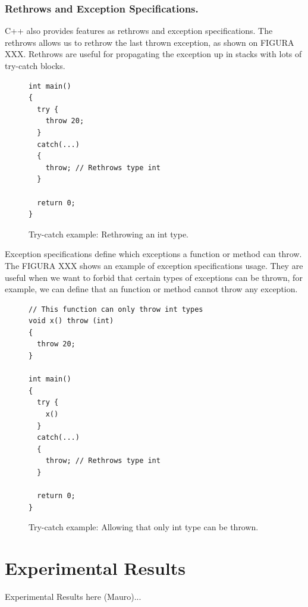 \documentclass[a4paper]{llncs}
\begin{document}
\subsubsection{Rethrows and Exception Specifications.}

C++ also provides features as rethrows and exception specifications. The rethrows allows us to rethrow the last thrown exception, 
as shown on FIGURA XXX. Rethrows are useful for propagating the exception up in stacks with lots of try-catch blocks.

\begin{figure}[ht]
\centering
\begin{minipage}{0.7\textwidth}
\begin{lstlisting}
int main() 
{
  try {
    throw 20;
  }
  catch(...)
  { 
    throw; // Rethrows type int
  }

  return 0;
}
\end{lstlisting}
\end{minipage}
\caption{Try-catch example: Rethrowing an int type.}
\label{figure:try-catch-example}
\end{figure}

Exception specifications define which exceptions a function or method can throw. The FIGURA XXX shows an example of exception specifications
usage. They are useful when we want to forbid that certain types of exceptions can be thrown, for example, we can define that an function
or method cannot throw any exception.

\begin{figure}[ht]
\centering
\begin{minipage}{0.7\textwidth}
\begin{lstlisting}
// This function can only throw int types
void x() throw (int) 
{ 
  throw 20;
}

int main() 
{
  try {
    x()
  }
  catch(...)
  { 
    throw; // Rethrows type int
  }

  return 0;
}
\end{lstlisting}
\end{minipage}
\caption{Try-catch example: Allowing that only int type can be thrown.}
\label{figure:try-catch-example}
\end{figure}


\section{Experimental Results}
%
Experimental Results here (Mauro)...
\end{document}
